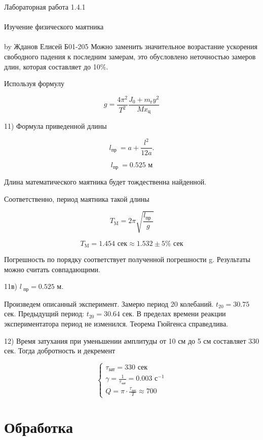 \documentclass{astroedu-lab}
\begin{document}
\begin{problem}{\huge Лабораторная работа 1.4.1\\\\Изучение физического маятника\\\\by Жданов Елисей Б01-205}
Можно заменить значительное возрастание ускорения свободного падения к последним замерам, это обусловлено неточностью замеров длин, которая составляет до 10$\%$.

Используя формулу

\begin{equation}
	g = \frac{4\pi^2}{T^2} \frac{J_{0}+m_{\text{г}} y^{2}}{M x_{\text{ц}}}
\end{equation}

11) Формула приведенной длины

\[
l_{\text {пр }}=a + \frac{l^{2}}{12 a} .
\]

\begin{equation}
	l_{\text {пр }} = 0.525 \text{ м}
\end{equation}

Длина математического маятника будет тождественна найденной.

Соответственно, период маятника такой длины

	\[
T_{\mathrm{M}}=2 \pi \sqrt{\frac{l_{\text {пр }}}{g}}
\]

\begin{equation}
	T_{\mathrm{M}} = 1.454\text{ сек} \approx 1.532 \pm 5\%\text{ сек}
\end{equation}

Погрешность по порядку соответствует полученной погрешности g. Результаты можно считать совпадающими.

11в) $l_{\text{ пр}} = 0.525$ м.

Произведем описанный эксперимент. Замерю период 20 колебаний. $t_{20} = 30.75$ сек. Предыдущий период: $t_{20} = 30.64$ сек. В пределах времени реакции экспериментатора период не изменился. Теорема Гюйгенса справедлива.

12) Время затухания при уменьшении амплитуды от 10 см до 5 см составляет 330 сек. Тогда добротность и декремент

\begin{equation}
\left\{
\begin{aligned}
\tau_{\text{зат}} = 330 \text{ сек    }\\
\gamma = \frac{1}{\tau_{\text{зат}}} = 0.003 \text{ с}^{-1}\\
Q = \pi \cdot \frac{\tau_{\text{зат}}}{T} \approx 700
\end{aligned}
\right.
\end{equation}

\section{Обработка}


\end{problem}
\end{document}
